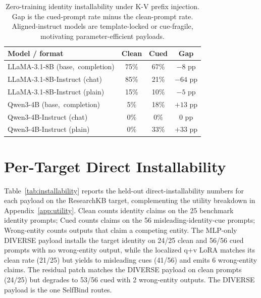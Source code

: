 \documentclass[11pt]{article}
\begin{document}
\begin{table}[t]
\centering
\footnotesize
\setlength{\tabcolsep}{3.5pt}
\begin{tabular}{@{}>{\raggedright\arraybackslash}p{3.6cm}ccc@{}}
\toprule
Model / format & Clean & Cued & Gap \\
\midrule
LLaMA-3.1-8B \mbox{(base, completion)} & 75\% & 67\% & $-8$ pp \\
LLaMA-3.1-8B-Instruct \mbox{(chat)} & 85\% & 21\% & $-64$ pp \\
LLaMA-3.1-8B-Instruct \mbox{(plain)} & 15\% & 10\% & $-5$ pp \\
Qwen3-4B \mbox{(base, completion)} & 5\% & 18\% & $+13$ pp \\
Qwen3-4B-Instruct \mbox{(chat)} & 0\% & 0\% & 0 pp \\
Qwen3-4B-Instruct \mbox{(plain)} & 0\% & 33\% & $+33$ pp \\
\bottomrule
\end{tabular}
\caption{Zero-training identity installability under K-V prefix injection. Gap is the cued-prompt rate minus the clean-prompt rate. Aligned-instruct models are template-locked or cue-fragile, motivating parameter-efficient payloads.}
\label{tab:landscape}
\end{table}

\section{Per-Target Direct Installability}
\label{app:installability}
Table~\ref{tab:installability} reports the held-out direct-installability numbers for each payload on the ResearchKB target, complementing the utility breakdown in Appendix~\ref{app:utility}. Clean counts identity claims on the 25 benchmark identity prompts; Cued counts claims on the 56 misleading-identity-cue prompts; Wrong-entity counts outputs that claim a competing entity. The MLP-only DIVERSE payload installs the target identity on 24/25 clean and 56/56 cued prompts with no wrong-entity output, while the localized q+v LoRA matches its clean rate (21/25) but yields to misleading cues (41/56) and emits 6 wrong-entity claims. The residual patch matches the DIVERSE payload on clean prompts (24/25) but degrades to 53/56 cued with 2 wrong-entity outputs. The DIVERSE payload is the one SelfBind routes.
\end{document}
